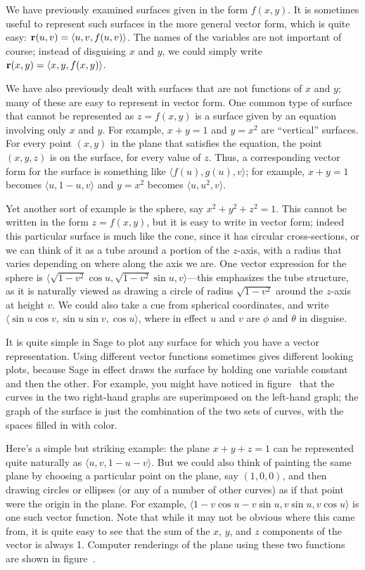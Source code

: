 We have previously examined surfaces given in the form 
$f(x,y)$. It is sometimes useful to represent such surfaces in the
more general vector form, which is quite easy:
${\bf r}(u,v)=\langle u,v,f(u,v)\rangle$. The names of the variables
are not important of course; instead of disguising $x$ and $y$, we
could simply write ${\bf r}(x,y)=\langle x,y,f(x,y)\rangle$. 

We have also previously dealt with surfaces that are not functions of
$x$ and $y$; many of these are easy to represent in vector form.
One common type of surface that cannot be represented as $z=f(x,y)$ is
a surface given by an equation involving only $x$ and $y$. For
example,
$x+y=1$ and $y=x^2$ are ``vertical'' surfaces. For every point $(x,y)$
in the plane that satisfies the equation, the point $(x,y,z)$ is on
the surface, for 
every value of $z$. Thus, a corresponding vector form for the surface
is something like $\langle f(u),g(u),v\rangle$; for example, $x+y=1$
becomes $\langle u,1-u,v\rangle$ and $y=x^2$ becomes $\langle
u,u^2,v\rangle$. 

Yet another sort of example is the sphere, say $x^2+y^2+z^2=1$. This
cannot be written in the form $z=f(x,y)$, but it is easy to write in
vector form; indeed this particular surface is much like the cone,
since it has circular cross-sections, or we can think of it as a tube
around a portion of the $z$-axis, with a radius that varies depending
on where along the axis we are. One vector expression for the sphere
is $\langle \sqrt{1-v^2}\cos u,\sqrt{1-v^2}\sin u, v\rangle$---this
emphasizes the tube structure, as it is naturally viewed as drawing a
circle of radius $\sqrt{1-v^2}$ around the $z$-axis at height $v$.
We could also take a cue from spherical coordinates, and write
$\langle \sin u\cos v,\sin u\sin v,\cos u\rangle$, where in effect
$u$ and $v$ are $\phi$ and $\theta$ in disguise. 

It is quite simple in Sage to plot any surface for which you have a
vector representation. Using different vector functions sometimes
gives different looking plots, because Sage in effect draws the
surface by holding one variable constant and then the other. For
example, you might have noticed in figure~
that the curves in the two right-hand graphs are superimposed on the
left-hand graph; the graph of the surface is just the combination of
the two sets of curves, with the spaces filled in with color. 

Here's a simple but striking example: the plane $x+y+z=1$ can be
represented quite naturally as $\langle u,v,1-u-v\rangle$. But we
could also think of painting the same plane by choosing a particular
point on the plane, say $(1,0,0)$, and then drawing circles or
ellipses (or any of a number of other curves) as if that point were
the origin in the plane. For example, $\langle 1-v\cos u-v\sin u,v\sin
u,v\cos u\rangle$ is one such vector function. Note that while it may
not be obvious where this came from, it is quite easy to see that
the sum of the $x$, $y$, and $z$ components of the vector is always
1. Computer renderings of the plane using these two functions are shown
in figure~.

